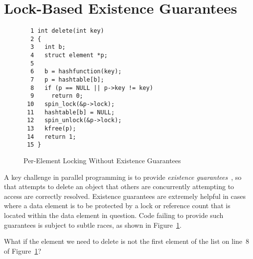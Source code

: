 
\section{Lock-Based Existence Guarantees}
\label{sec:locking:Lock-Based Existence Guarantees}

\begin{figure}[tbp]
{ \scriptsize
\begin{verbatim}
  1 int delete(int key)
  2 {
  3   int b;
  4   struct element *p;
  5
  6   b = hashfunction(key);
  7   p = hashtable[b];
  8   if (p == NULL || p->key != key)
  9     return 0;
 10   spin_lock(&p->lock);
 11   hashtable[b] = NULL;
 12   spin_unlock(&p->lock);
 13   kfree(p);
 14   return 1;
 15 }
\end{verbatim}
}
\caption{Per-Element Locking Without Existence Guarantees}
\label{fig:locking:Per-Element Locking Without Existence Guarantees}
\end{figure}

A key challenge in parallel programming is to provide
\emph{existence guarantees}~\cite{Gamsa99},
so that attempts to delete an object that others are concurrently
attempting to access are correctly resolved.
Existence guarantees are extremely helpful in cases where a data
element is to be protected by a lock or reference count that is
located within the data element in question.
Code failing to provide such guarantees is subject to subtle races,
as shown in
Figure~\ref{fig:locking:Per-Element Locking Without Existence Guarantees}.

\QuickQuiz{}
	What if the element we need to delete is not the first element
	of the list on line~8 of
	Figure~\ref{fig:locking:Per-Element Locking Without Existence Guarantees}?
 \QuickQuizEnd

